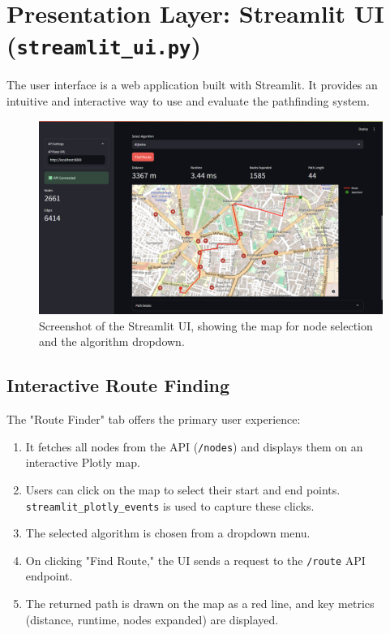\documentclass[12pt, a4paper]{report}
\begin{document}
\section{Presentation Layer: Streamlit UI (\texttt{streamlit\_ui.py})}

The user interface is a web application built with Streamlit. It provides an intuitive and interactive way to use and evaluate the pathfinding system.

\begin{figure}[h!]
    \centering
    \includegraphics[width=0.9\linewidth]{figures/streamlit_ui.png}
    \caption{Screenshot of the Streamlit UI, showing the map for node selection and the algorithm dropdown.}
    \label{fig:ui}
\end{figure}

\subsection{Interactive Route Finding}
The "Route Finder" tab offers the primary user experience:
\begin{enumerate}
    \item It fetches all nodes from the API (\texttt{/nodes}) and displays them on an interactive Plotly map.
    \item Users can click on the map to select their start and end points. \texttt{streamlit\_plotly\_events} is used to capture these clicks.
    \item The selected algorithm is chosen from a dropdown menu.
    \item On clicking "Find Route," the UI sends a request to the \texttt{/route} API endpoint.
    \item The returned path is drawn on the map as a red line, and key metrics (distance, runtime, nodes expanded) are displayed.
\end{enumerate}
\end{document}
